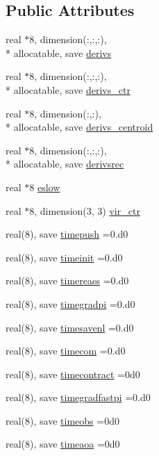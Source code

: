 \subsection*{Public Attributes}
\begin{DoxyCompactItemize}
\item 
real $\ast$8, dimension(\-:,\-:,\-:), \\*
allocatable, save \hyperlink{classutilbaoabpi_adac13aaebc59c9f65c4db8be552657ba}{derivs}
\item 
real $\ast$8, dimension(\-:,\-:,\-:), \\*
allocatable, save \hyperlink{classutilbaoabpi_aa4c57851112377f82b13361a27277120}{derivs\-\_\-ctr}
\item 
real $\ast$8, dimension(\-:,\-:), \\*
allocatable, save \hyperlink{classutilbaoabpi_a67505f362b7c39accc88c2eac1933519}{derivs\-\_\-centroid}
\item 
real $\ast$8, dimension(\-:,\-:,\-:), \\*
allocatable, save \hyperlink{classutilbaoabpi_a33c76ac8241feb8e9c8669731a605d65}{derivsrec}
\item 
real $\ast$8 \hyperlink{classutilbaoabpi_a9caab6874b7ea252f61f3a9ff137854a}{eslow}
\item 
real $\ast$8, dimension(3, 3) \hyperlink{classutilbaoabpi_a0771b4015356ff89c136bdbe85d441c4}{vir\-\_\-ctr}
\item 
real(8), save \hyperlink{classutilbaoabpi_af5bf31b45a8a5e575131e62483250ffb}{timepush} =0.d0
\item 
real(8), save \hyperlink{classutilbaoabpi_a6914943535cb774d1fdecae40d657e86}{timeinit} =0.d0
\item 
real(8), save \hyperlink{classutilbaoabpi_a18904bbe7e1c94539761412da71d7f29}{timereass} =0.d0
\item 
real(8), save \hyperlink{classutilbaoabpi_a5c70fdf8f4327a097c87c582900e7c4b}{timegradpi} =0.d0
\item 
real(8), save \hyperlink{classutilbaoabpi_a22e7f67ae4c1ea38f973f74a6630d52a}{timesavenl} =0.d0
\item 
real(8), save \hyperlink{classutilbaoabpi_a50d3e390c7aa386e779ebdf2f3594903}{timecom} =0.d0
\item 
real(8), save \hyperlink{classutilbaoabpi_a53b19fe49bb28da1a1e5b8c6661f4cc7}{timecontract} =0d0
\item 
real(8), save \hyperlink{classutilbaoabpi_ad957e98b45d393c84c8e00a86887d2b7}{timegradfastpi} =0.d0
\item 
real(8), save \hyperlink{classutilbaoabpi_afe30853c7b0c348013c9d7ea86aa53e0}{timeobs} =0d0
\item 
real(8), save \hyperlink{classutilbaoabpi_a2852b9f4bf70cdfb023ae00de30fb391}{timeaoa} =0d0
\end{DoxyCompactItemize}


